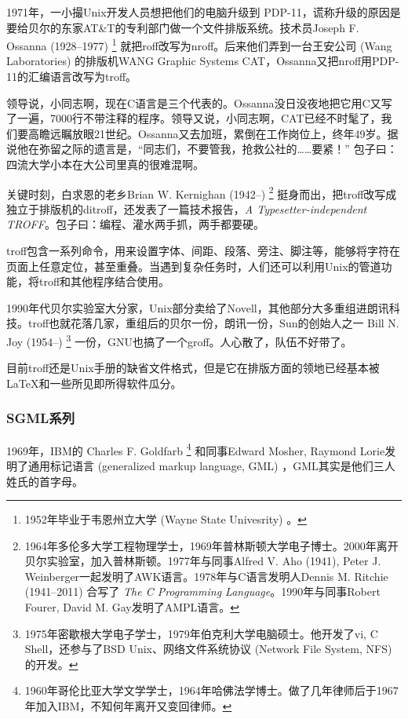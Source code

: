 1971年，一小撮Unix开发人员想把他们的电脑升级到 PDP-11，谎称升级的原因是要给贝尔的东家AT\&T\indexATT 的专利部门做一个文件排版系统。技术员Joseph F. Ossanna (1928--1977)\indexOssanna{} \footnote{1952年毕业于韦恩州立大学 (Wayne State Univesrity) 。} 就把roff改写为nroff。后来他们弄到一台王安公司 (Wang Laboratories)\indexWangLabs{} 的排版机WANG Graphic Systems CAT，Ossanna又把nroff用PDP-11的汇编语言改写为troff。

领导说，小同志啊，现在C语言是三个代表的。Ossanna没日没夜地把它用C又写了一遍，7000行不带注释的程序。领导又说，小同志啊，CAT已经不时髦了，我们要高瞻远瞩放眼21世纪。Ossanna又去加班，累倒在工作岗位上，终年49岁。据说他在弥留之际的遗言是，“同志们，不要管我，抢救公社的……要紧！” 包子曰：四流大学小本在大公司里真的很难混啊。

关键时刻，白求恩的老乡Brian W. Kernighan (1942--)\indexKernighan{} \footnote{1964年多伦多大学工程物理学士，1969年普林斯顿大学电子博士。2000年离开贝尔实验室，加入普林斯顿。1977年与同事Alfred V. Aho (1941), Peter J. Weinberger一起发明了AWK语言。1978年与C语言发明人Dennis M. Ritchie (1941--2011) 合写了 \emph{The C Programming Language}。1990年与同事Robert Fourer, David M. Gay发明了AMPL语言。} 挺身而出，把troff改写成独立于排版机的ditroff，还发表了一篇技术报告，\emph{A Typesetter-independent TROFF}。包子曰：编程、灌水两手抓，两手都要硬。

troff包含一系列命令，用来设置字体、间距、段落、旁注、脚注等，能够将字符在页面上任意定位，甚至重叠。当遇到复杂任务时，人们还可以利用Unix的管道功能，将troff和其他程序结合使用。

1990年代贝尔实验室大分家，Unix部分卖给了Novell，其他部分大多重组进朗讯科技\indexLucent。troff也就花落几家，重组后的贝尔一份，朗讯一份，Sun的创始人之一 Bill N. Joy (1954--)\indexJoy{} \footnote{1975年密歇根大学电子学士，1979年伯克利大学电脑硕士。他开发了vi, C Shell，还参与了BSD Unix、网络文件系统协议 (Network File System, NFS) 的开发。} 一份，GNU\indexGNU 也搞了一个groff。人心散了，队伍不好带了。

目前troff还是Unix手册的缺省文件格式，但是它在排版方面的领地已经基本被 \LaTeX 和一些所见即所得软件瓜分。

\subsubsection{SGML系列}

1969年，IBM\indexIBM 的 Charles F. Goldfarb\indexGoldfarb{} \footnote{1960年哥伦比亚大学文学学士，1964年哈佛法学博士。做了几年律师后于1967年加入IBM，不知何年离开又变回律师。} 和同事Edward Mosher\indexMosher , Raymond Lorie\indexLorie 发明了通用标记语言 (generalized markup language, GML) ，GML其实是他们三人姓氏的首字母。

